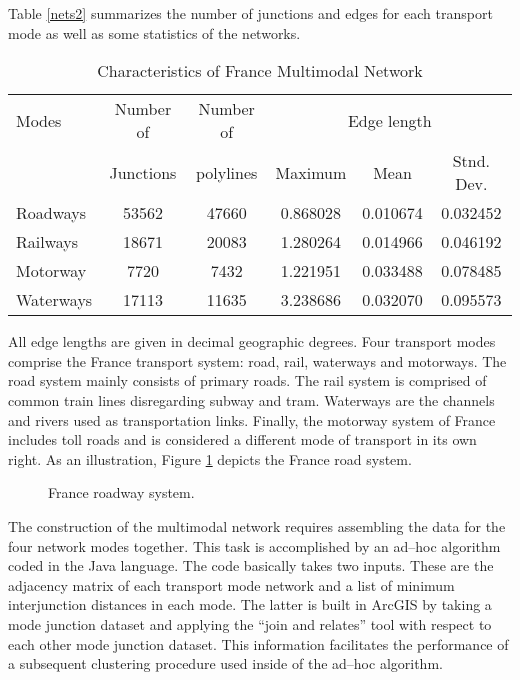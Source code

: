 \documentclass[preprint,authoryear,12pt]{elsarticle}
\begin{document}
Table \ref{nets2} summarizes the number of junctions and  edges for each transport
mode as well as some statistics of the networks.
\begin{table}[b]
\caption{Characteristics of France Multimodal Network}\label{nets2}
\vspace{-0.5cm}
\begin{center}
\begin{tabular}{lccccc}\hline
  Modes          & Number of          & Number of & \multicolumn{3}{c}{Edge length}       \\ \cline{4-6}
                 & Junctions          & polylines     & Maximum    & Mean        & Stnd. Dev.  \\ \hline 
  Roadways       & 53562              & 47660     & 0.868028   & 0.010674    & 0.032452     \\
  Railways       & 18671              & 20083     & 1.280264   & 0.014966    & 0.046192     \\
  Motorway       & 7720               & 7432      & 1.221951   & 0.033488    & 0.078485      \\
  Waterways      & 17113	            & 11635     & 3.238686   & 0.032070    & 0.095573       \\
  \hline
\end{tabular}
\end{center}
\label{junctions}
\end{table}
All edge lengths are given in decimal geographic degrees.
Four transport modes comprise the France transport system: road, rail, waterways and
motorways. The road system  mainly consists of primary roads. The rail system is
comprised of common train lines disregarding subway and tram. Waterways are the
channels and rivers used as transportation links. Finally, the motorway system of
France includes toll roads and is considered a different mode of transport in its
own right. As an illustration,
Figure \ref{FranceRW} depicts the France road system.
\begin{figure}
\caption{France roadway system.}
\label{FranceRW}
\end{figure}

The construction of the multimodal network requires assembling the data
for the four network modes together. This task is accomplished by an
ad--hoc algorithm coded in the Java language. The code basically takes
two inputs. These are the adjacency matrix of each transport mode network
and a list of minimum interjunction distances in each mode. The latter
is built in ArcGIS by taking a mode junction dataset and applying the
``join and relates'' tool with respect to each other mode junction dataset.
This information facilitates the performance of a subsequent
clustering procedure used inside of the ad--hoc algorithm.
\end{document}
